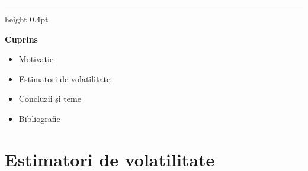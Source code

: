 \documentclass[9pt, aspectratio=169, t]{beamer}
\theoremstyle{definition}
\begin{document}
{
\begin{frame}{}
    {\color{FooterGray}\hrule height 0.4pt}

    \vspace{0.3cm}

    {\Large\textcolor{IDAred}{\textbf{Cuprins}}}

    \vspace{0.4cm}

    \begin{itemize}
        \item Motivație \checkmark
        \item Estimatori de volatilitate
        \item Concluzii și teme
        \item Bibliografie
    \end{itemize}
\end{frame}
}

\section{Estimatori de volatilitate}
\end{document}
